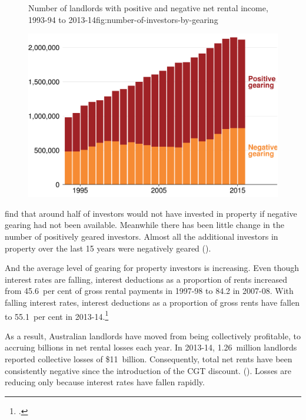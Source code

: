 \documentclass{grattan}\usepackage[]{graphicx}\usepackage[]{color}
\begin{document}
\begin{figure}
%
{Number of landlords with positive and negative net rental income, 1993-94 to 2013-14}{fig:number-of-investors-by-gearing}

\includegraphics[width=\columnwidth]{CGT-NG-atlas//number-of-investors-by-gearing-1}
\end{figure}

\textcite{seelig2009understanding} find that around half of investors would not have invested in property if negative gearing had not been available.  Meanwhile there has been little change in the number of positively geared investors. Almost all the additional investors in property over the last 15 years were negatively geared ().


 
 And the average level of gearing for property investors is increasing.
 Even though interest rates are falling, interest deductions as a proportion of rents increased from 45.6~per cent of gross rental payments in \mbox{1997-98} to 84.2 in 2007-08. With falling interest rates, interest deductions as a proportion of gross rents have fallen to 55.1~per cent in 2013-14.\footcite[p.~65]{Treasury2015a}
 


As a result, Australian landlords have moved from being collectively profitable, to accruing billions in net rental losses each year. In 2013-14, 1.26~million landlords reported collective losses of \$11~billion. Consequently, total net rents have been consistently negative since the introduction of the CGT discount. ().  Losses are reducing only because interest rates have fallen rapidly.
\end{document}
